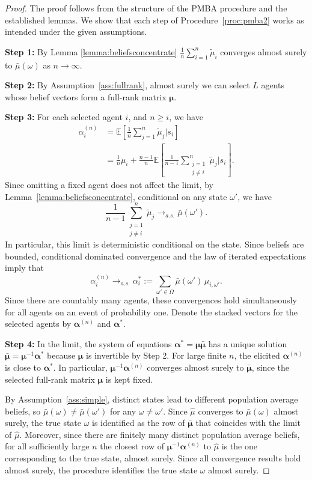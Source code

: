 \documentclass[12pt,reqno]{amsart}
\newcommand{\tmu}{\tilde{\mu}}
\begin{document}
\begin{proof}
The proof follows from the structure of the PMBA procedure and the established lemmas. We show that each step of Procedure~\ref{proc:pmba2} works as intended under the given assumptions.

\textbf{Step 1:} By Lemma \ref{lemma:beliefsconcentrate} $\frac1n \sum_{i=1}^n \tmu_i$ converges almost surely to $\bar{\mu}(\omega)$ as $n \to \infty$.

\textbf{Step 2:} By Assumption~\ref{ass:fullrank}, almost surely we can select $L$ agents whose belief vectors form a full-rank matrix $\bm{\mu}$. 

\textbf{Step 3:} For each selected agent $i$, and $n\geq i$, we have
\begin{align*}
\alpha_i^{(n)}
&= \mathbb{E}\left[\frac1n\sum_{j=1}^n \tmu_j\bigg|s_i\right] \\
&= \frac1n\mu_i+\frac{n-1}{n}\mathbb{E}\left[
\frac1{n-1}\sum_{\substack{j=1\\j\neq i}}^n\tmu_j
\bigg|s_i\right].
\end{align*}
Since omitting a fixed agent does not affect the limit, by Lemma~\ref{lemma:beliefsconcentrate}, conditional on any state $\omega'$, we have
\[
\frac1{n-1}\sum_{\substack{j=1\\j\neq i}}^n\tmu_j
\to_{a.s.} \bar\mu(\omega')
.
\]
In particular, this limit is deterministic conditional on the state. Since beliefs are bounded, conditional dominated convergence and the law of iterated expectations imply that
\[
\alpha_i^{(n)}\to_{a.s.}
\alpha_i^\ast:=\sum_{\omega'\in\Omega}\bar\mu(\omega')\,\mu_{i,\omega'}.
\]
Since there are countably many agents, these convergences hold simultaneously for all agents on an event of probability one. Denote the stacked vectors for the selected agents by $\bm{\alpha}^{(n)}$ and $\bm{\alpha}^\ast$.

\textbf{Step 4:} In the limit, the system of equations $\bm{\alpha}^{\ast}=\bm{\mu}\bar{\bm{\mu}}$ has a unique solution $\bar{\bm{\mu}}=\bm{\mu}^{-1}\bm{\alpha}^{\ast}$ because $\bm{\mu}$ is invertible by Step 2. For large finite $n$, the elicited $\bm{\alpha}^{(n)}$ is close to $\bm{\alpha}^{\ast}$. In particular, $\bm{\mu}^{-1}\bm{\alpha}^{(n)}$ converges almost surely to $\bar{\bm{\mu}}$, since the selected full-rank matrix $\bm{\mu}$ is kept fixed.

By Assumption~\ref{ass:simple}, distinct states lead to different population average beliefs, so $\bar{\mu}(\omega)\neq\bar{\mu}(\omega')$ for any $\omega\neq\omega'$. Since $\hat{\mu}$ converges to $\bar{\mu}(\omega)$ almost surely, the true state $\omega$ is identified as the row of $\bar{\bm{\mu}}$ that coincides with the limit of $\hat{\mu}$. Moreover, since there are finitely many distinct population average beliefs, for all sufficiently large $n$ the closest row of $\bm{\mu}^{-1}\bm{\alpha}^{(n)}$ to $\hat{\mu}$ is the one corresponding to the true state, almost surely. Since all convergence results hold almost surely, the procedure identifies the true state $\omega$ almost surely.
\end{proof}
\end{document}
